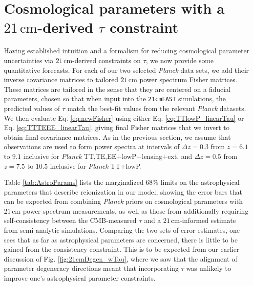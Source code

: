 \documentclass[twocolumn,aps,prd,nofootinbib,showpacs,superscriptaddress]{revtex4-1}
\begin{document}
\section{Cosmological parameters with a $21\,\textrm{cm}$-derived $\tau$ constraint}
\label{sec:CMBresults}

Having established intuition and a formalism for reducing cosmological parameter uncertainties via $21\,\textrm{cm}$-derived constraints on $\tau$, we now provide some quantitative forecasts. For each of our two selected \emph{Planck} data sets, we add their inverse covariance matrices to tailored $21\,\textrm{cm}$ power spectrum Fisher matrices. These matrices are tailored in the sense that they are centered on a fiducial parameters, chosen so that when input into the {\tt 21cmFAST} simulations, the predicted values of $\tau$ match the best-fit values from the relevant \emph{Planck} datasets. We then evaluate Eq. \eqref{eq:newFisher} using either Eq. \eqref{eq:TTlowP_linearTau} or Eq. \eqref{eq:TTTEEE_linearTau}, giving final Fisher matrices that we invert to obtain final covariance matrices. As in the previous section, we assume that observations are used to form power spectra at intervals of $\Delta z = 0.3$ from $z = 6.1$ to $9.1$ inclusive for \emph{Planck} TT,TE,EE+lowP+lensing+ext, and $\Delta z = 0.5$ from $z=7.5$ to $10.5$ inclusive for \emph{Planck} TT+lowP.

Table \ref{tab:AstroParams} lists the marginalized $68\%$ limits on the astrophysical parameters that describe reionization in our model, showing the error bars that can be expected from combining \emph{Planck} priors on cosmological parameters with $21\,\textrm{cm}$ power spectrum measurements, as well as those from additionally requiring self-consistency between the CMB-measured $\tau$ and a $21\,\textrm{cm}$-informed estimate from semi-analytic simulations. Comparing the two sets of error estimates, one sees that as far as astrophysical parameters are concerned, there is little to be gained from the consistency constraint. This is to be expected from our earlier discussion of Fig. \ref{fig:21cmDegen_wTau}, where we saw that the alignment of parameter degeneracy directions meant that incorporating $\tau$ was unlikely to improve one's astrophysical parameter constraints.
\end{document}

